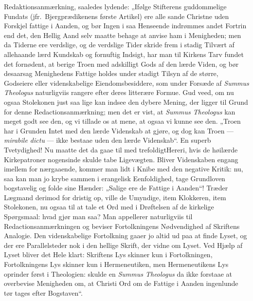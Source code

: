 \documentclass[12pt,a4paper]{book}
\begin{document}
Redaktionsanmærkning, saaledes lydende: „Ifølge Stifterens guddommelige Fundats (jfr.\
Bjergprædikenens første Artikel) ere alle sande Christne uden Forskjel fattige i
Aanden, og bør Ingen i saa Henseende indrømmes andet Fortrin end det, den Hellig Aand
selv maatte behage at anvise ham i Menigheden; men
da Tiderne ere verdslige, og de verdslige Tider skride frem i stadig Tilvært af
allehaande lærd Kundskab og fornuftig Indsigt, har man til Kirkens Tarv fundet det
fornødent, at berige Troen med adskilligt Gods af den lærde Viden, og bør desaarsag
Menighedens Fattige holdes under stadigt Tilsyn af de større, Godseiere eller
videnskabelige Eiendomsbesiddere, som under Forsæde af \textit{Summus Theologus}
naturligviis rangere efter deres litterære Formue. Gud veed, om nu ogsaa Stolekonen
just saa lige kan indsee den dybere Mening, der ligger til Grund for denne
Redactionsanmærkning; men det er vist, at \textit{Summus Theologus} kan meget godt see
den, og vi tillade os at mene, at ogsaa vi kunne see den. „Troen har i Grunden Intet
med den lærde Videnskab at gjøre, og dog kan Troen --- \textit{mirabile dictu} --- ikke
bestaae uden den lærde Videnskab“. En superb Tvetydighed! Nu maatte det da gaae til med
trefoldigtHereri, hvis de høilærde Kirkepatroner nogensinde skulde tabe Ligevægten.
Bliver Videnskaben engang imellem for nærgaaende, kommer man lidt i Knibe med den
negative Kritik: nu, saa kan man jo krybe sammen i erangelisk Eenfoldighed, tage
Grundloven bogstavelig og folde sine Hænder: „Salige ere de Fattige i Aanden“! Træder
Lægmand derimod for dristig op, ville de Umyndige, item Klokkeren, item Stolekonen, nu
ogsaa til at tale et Ord med i Drøftelsen af de kirkelige Spørgsmaal: hvad gjør man
saa? Man appellerer naturligviis til Redactionsanmærkningen og beviser Fortolkningens
Nødvendighed af Skriftens Analogie. Den videnskabelige Fortolkning gaaer jo altid ud
paa at finde Lyset, og der ere Parallelsteder nok i den hellige Skrift, der vidne om
Lyset. Ved Hjælp af Lyset bliver det Hele klart: Skriftens Lys skinner kun i
Fortolkningen, Fortolkningens Lys skinner kun i Hermeneutiken, men Hermeneutikens Lys
oprinder først i Theologien: skulde en \textit{Summus Theologus} da ikke
forstaae at overbevise Menigheden om, at Christi Ord om de Fattige i Aanden ingenlunde
tør tages efter Bogstaven“.
\end{document}
